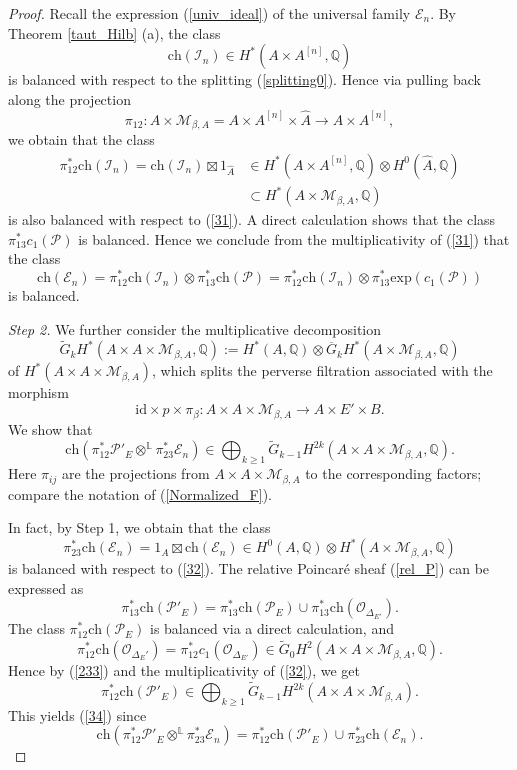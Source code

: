 \documentclass[11pt]{amsart}
\theoremstyle{plain}
\theoremstyle{definition}
\theoremstyle{remark}
\newcommand{\BL}{{\mathbb{L}}}
\newcommand{\BQ}{{\mathbb{Q}}}
\newcommand{\CE}{{\mathcal E}}
\newcommand{\CI}{{\mathcal I}}
\newcommand{\CM}{{\mathcal M}}
\newcommand{\CO}{{\mathcal O}}
\newcommand{\CP}{{\mathcal P}}
\begin{document}
\begin{proof}
Recall the expression (\ref{univ_ideal}) of the universal family $\CE_n$. By Theorem \ref{taut_Hilb} (a), the class
\[
\mathrm{ch}(\CI_n) \in  H^{\ast}(A\times A^{[n]}, \BQ)
\]
is balanced with respect to the splitting (\ref{splitting0}). Hence via pulling back along the projection
\[
\pi_{12}: A\times \CM_{\beta,A} = A\times A^{[n]} \times \hat{A} \to A \times A^{[n]},
\]
we obtain that the class 
\[
\begin{split}
\pi_{12}^\ast \mathrm{ch}(\CI_n) =  \mathrm{ch}(\CI_n) \boxtimes 1_{\hat{A}} & \in H^\ast(A \times A^{[n]}, \BQ) \otimes H^0(\hat{A}, \BQ)\\  & \subset H^*(A\times \CM_{\beta,A}, \BQ)
\end{split}
\]
is also balanced with respect to (\ref{31}). A direct calculation shows that the class $\pi_{13}^\ast c_1(\CP)$ is balanced. Hence we conclude from the multiplicativity of (\ref{31}) that the class
\[
\mathrm{ch}(\CE_n) = \pi_{12}^\ast \mathrm{ch}(\CI_n) \otimes \pi_{13}^\ast \mathrm{ch}(\CP)=  \pi_{12}^\ast \mathrm{ch}(\CI_n) \otimes \pi_{13}^\ast \mathrm{exp}(c_1(\CP))
\]
is balanced. 


\noindent \emph{Step 2.} We further consider the multiplicative decomposition  
\begin{equation}\label{32}
\widetilde{G}_k H^*(A \times A \times \CM_{\beta, A}, \BQ) := H^*(A, \BQ) \otimes \overline{G}_k H^*(A \times \CM_{\beta, A}, \BQ)
\end{equation}
of $H^*(A \times A \times \CM_{\beta, A})$, which splits the perverse filtration associated with the morphism
\[
\mathrm{id} \times p \times \pi_\beta: A \times A \times \CM_{\beta, A} \to A \times E'\times B.
\]
We show that 
\begin{equation}\label{34}
\mathrm{ch}(\pi_{12}^\ast {\CP'_{E}} \otimes^{\BL} \pi_{23}^\ast \CE_n) \in \bigoplus_{k\geq 1}\widetilde{G}_{k-1} H^{2k}(A \times A\times \CM_{\beta, A}, \BQ).
\end{equation}
Here $\pi_{ij}$ are the projections from $A\times A \times \CM_{\beta,A}$ to the corresponding factors; compare the notation of (\ref{Normalized_F}).


In fact, by Step 1, we obtain that the class
\[
\pi_{23}^* \mathrm{ch}(\CE_n) = 1_A \boxtimes \mathrm{ch}(\CE_n) \in H^0(A, \BQ) \otimes H^*(A\times \CM_{\beta,A}, \BQ)
\]
is balanced with respect to (\ref{32}). The relative Poincar\'e sheaf (\ref{rel_P}) can be expressed as
\begin{equation}\label{233}
\pi_{13}^\ast \mathrm{ch}(\CP'_E) = \pi_{13}^\ast \mathrm{ch}(\CP_E)\cup \pi_{13}^* \mathrm{ch}(\CO_{\Delta_{E'}}).
\end{equation}
The class $\pi_{12}^\ast \mathrm{ch}(\CP_E)$ is balanced via a direct calculation, and 
\[
\pi_{12}^*\mathrm{ch}(\CO_{\Delta_E'}) = \pi_{12}^* c_1(\CO_{\Delta_{E'}}) \in \widetilde{G}_0 H^2(A\times A \times \CM_{\beta,A}, \BQ).
\]
Hence by (\ref{233}) and the multiplicativity of (\ref{32}), we get
\[
\pi_{12}^* \mathrm{ch}(\CP'_E)\in \bigoplus_{k\geq 1} \widetilde{G}_{k-1}H^{2k}(A\times A \times \CM_{\beta,A}).
\]
This yields (\ref{34}) since
\[
\mathrm{ch}(\pi_{12}^\ast {\CP'_{E}} \otimes^{\BL} \pi_{23}^\ast \CE_n) = \pi_{12}^*\mathrm{ch}(\CP'_E) \cup \pi_{23}^\ast \mathrm{ch}(\CE_n).
\]


\end{proof}
\end{document}
